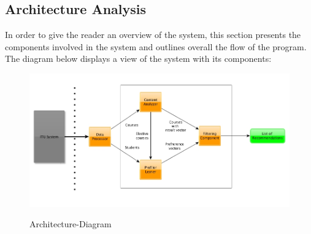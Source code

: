 

\subsection{Architecture Analysis}
In order to give the reader an overview of the system, this section presents the components involved in the system and outlines overall the flow of the program. The diagram below displays a view of the system with its components: 

\begin{figure}[H]
\centering
\includegraphics[scale=0.5]{Pictures/Architecture-Diagram.jpg}
\label{Architecture-Diagram}
\caption{Architecture-Diagram}
\end{figure}


